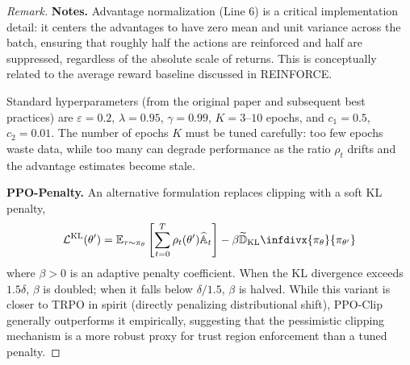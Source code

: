 \documentclass[11pt, letterpaper]{article}
\newcommand{\TKL}{\widetilde{\mathbb{D}}_{\text{KL}}\infdivx}
\newenvironment{remark}
    {\renewcommand\qedsymbol{\(\blacksquare\)}\begin{proof}[Remark]}
    {\end{proof}}
\begin{document}
\begin{remark}
    \textbf{Notes.} Advantage normalization (Line 6) is a critical implementation detail: it centers the advantages to have zero mean and unit variance across the batch, ensuring that roughly half the actions are reinforced and half are suppressed, regardless of the absolute scale of returns. This is conceptually related to the average reward baseline discussed in REINFORCE. 

    Standard hyperparameters (from the original paper and subsequent best practices) are \(\varepsilon = 0.2\), \(\lambda = 0.95\), \(\gamma = 0.99\), \(K = 3\text{--}10\) epochs, and \(c_1 = 0.5\), \(c_2 = 0.01\). The number of epochs \(K\) must be tuned carefully: too few epochs waste data, while too many can degrade performance as the ratio \(\rho_t\) drifts and the advantage estimates become stale.

    \textbf{PPO-Penalty.} An alternative formulation replaces clipping with a soft KL penalty, 
    \[
        \mathcal{L}^{\text{KL}}(\theta') = \mathbb{E}_{\tau \sim \pi_\theta}\left[\sum_{t=0}^T \rho_t(\theta') \widehat{\mathbb{A}}_t\right] - \beta \TKL{\pi_\theta}{\pi_{\theta'}}
    \]
    where \(\beta > 0\) is an adaptive penalty coefficient. When the KL divergence exceeds \(1.5\delta\), \(\beta\) is doubled; when it falls below \(\delta / 1.5\), \(\beta\) is halved. While this variant is closer to TRPO in spirit (directly penalizing distributional shift), PPO-Clip generally outperforms it empirically, suggesting that the pessimistic clipping mechanism is a more robust proxy for trust region enforcement than a tuned penalty.
\end{remark}
\end{document}
